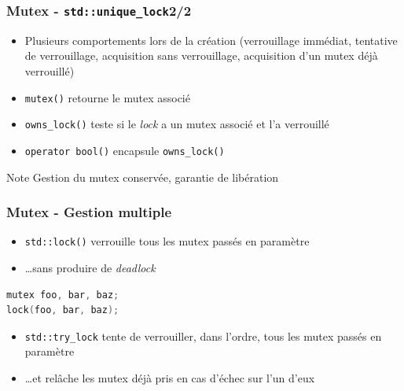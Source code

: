 \documentclass[C++.tex]{subfiles}
\begin{document}
\begin{frame}[fragile]
	\frametitle{Mutex - \lstinline|std::unique_lock|\titlehfill{}2/2}
	\begin{itemize}
		\item Plusieurs comportements lors de la création (verrouillage immédiat, tentative de verrouillage, acquisition sans verrouillage, acquisition d'un mutex déjà verrouillé)
		\item \lstinline|mutex()| retourne le mutex associé
		\item \lstinline|owns_lock()| teste si le \textit{lock} a un mutex associé et l'a verrouillé
		\item \lstinline|operator bool()| encapsule \lstinline|owns_lock()|
	\end{itemize}

	\begin{block}{Note}
		Gestion du mutex conservée, garantie de libération
	\end{block}
\end{frame}

\begin{frame}[fragile]
	\frametitle{Mutex - Gestion multiple}
	\begin{itemize}
		\item \lstinline|std::lock()| verrouille tous les mutex passés en paramètre
		\item \ldots{}sans produire de \textit{deadlock}
	\end{itemize}

	\begin{lstlisting}[language=C++]
mutex foo, bar, baz;
lock(foo, bar, baz);\end{lstlisting}

	\begin{itemize}
		\item \lstinline|std::try_lock| tente de verrouiller, dans l'ordre, tous les mutex passés en paramètre
		\item \ldots{}et relâche les mutex déjà pris en cas d'échec sur l'un d'eux
	\end{itemize}
\end{frame}
\end{document}
